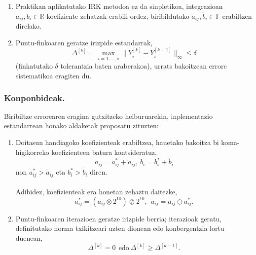 \begin{enumerate}
 \item Praktikan aplikatutako IRK metodoa ez da sinpletikoa, integrazioan $a_{ij}, b_i \in \mathbb{R}$ koefiziente zehatzak erabili ordez, biribildutako $\tilde a_{ij},\tilde b_i \in \mathbb{F}$ erabiltzen direlako. 
\item Puntu-finkoaren geratze irizpide estandarrak, 
\begin{equation}
\Delta ^{[k]} = \max_{i=1,\dots,s}\|Y_i^{[k]}-Y_i^{[k-1]}\|_{\infty} \le \delta
\end{equation}
(finkatutako $\delta$ tolerantzia baten araberakoa), urrats bakoitzean errore sistematikoa eragiten du.

\end{enumerate}    

\subsubsection*{Konponbideak.}

Biribiltze errorearen eragina gutxitzeko helburuarekin, inplementazio estandarrean honako aldaketak proposatu zituzten:
\begin{enumerate}
\item Doitasun handiagoko koefizienteak erabiltzea, hauetako bakoitza bi koma-higikorreko koefizienteen batura kontsideratuz,
\begin{equation}
\label{eq:hkoef}
a_{ij}= a^{\ast}_{ij}+\tilde a_{ij}, \ b_i= b^{\ast}_i+\tilde b_i
\end{equation} 
non $a^{\ast}_{ij}>\tilde a_{ij}$ eta  $b^{\ast}_i>\tilde b_i$ diren. 

\paragraph*{}Adibidez, koefizienteak era honetan zehaztu daitezke,
\begin{equation*}
a^{\ast}_{ij}=(a_{ij} \otimes 2^{10}) \oslash 2^{10},\ \ \tilde a_{ij}= a_{ij}\ominus a^{\ast}_{ij}.
\end{equation*}

\item Puntu-finkoaren iterazioen geratze irizpide berria; iterazioak geratu, definitutako norma txikitzeari uzten dionean edo konbergentzia lortu duenean,
\begin{equation}
\label{eq:hstop}
\Delta^{[k]} = 0 \ \ \text{edo} \  \Delta^{[k]} \geqslant \Delta^{[k-1]}.
\end{equation}
  	 	
\end{enumerate}

